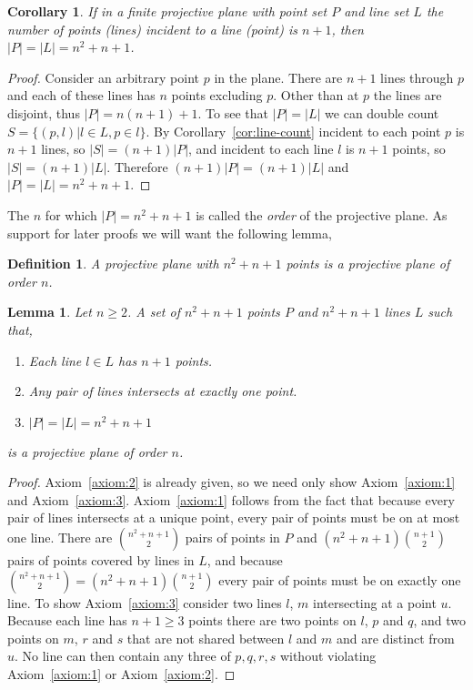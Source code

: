 \documentclass{article}
\newtheorem{lemma}{Lemma}
\newtheorem{corollary}{Corollary}
\newtheorem{definition}{Definition}
\begin{document}
\begin{corollary}
  If in a finite projective plane with point set \(P\) and line set \(L\) the number of points (lines) incident to a line (point) is \(n + 1\), then \(|P| = |L| = n^2 + n + 1\).
\end{corollary}
\begin{proof}\label{cor:p-count}
  Consider an arbitrary point \(p\) in the plane. There are \(n + 1\) lines through \(p\) and each of these lines has \(n\) points excluding \(p\). Other than at \(p\) the lines are disjoint, thus \(|P| = n(n + 1) + 1\).
  To see that \(|P| = |L|\) we can double count \(S = \{(p, l) | l \in L, p \in l\}\). By Corollary~\ref{cor:line-count} incident to each point \(p\) is \(n + 1\) lines, so \(|S| = (n + 1)|P|\), and incident to each line \(l\) is \(n + 1\) points, so \(|S| = (n + 1)|L|\). Therefore \((n + 1)|P| = (n + 1)|L|\) and \(|P| = |L| = n^2 + n + 1\).
\end{proof}

The \(n\) for which \(|P| = n^2 + n + 1\) is called the \textit{order} of the projective plane.
As support for later proofs we will want the following lemma,

\begin{definition}\label{definition:proj-order}
  A projective plane with \(n^{2} + n + 1\) points is a projective plane of order \(n\).
\end{definition}

\begin{lemma}\label{lemma:easy-proj}
  Let \(n \geq 2\). A set of \(n^{2} + n + 1\) points \(P\) and \(n^{2} + n + 1\) lines \(L\) such that,

  \begin{enumerate}
    \item Each line \(l \in L\) has \(n + 1\) points.
    \item Any pair of lines intersects at exactly one point.
    \item \(|P| = |L| = n^{2} + n + 1\)
  \end{enumerate}

  is a projective plane of order \(n\).
\end{lemma}

\begin{proof}
  Axiom~\ref{axiom:2} is already given, so we need only show Axiom~\ref{axiom:1} and Axiom~\ref{axiom:3}. Axiom~\ref{axiom:1} follows from the fact that because every pair of lines intersects at a unique point, every pair of points must be on at most one line. There are \(\binom{n^{2} + n + 1}{2}\) pairs of points in \(P\) and \((n^{2} + n + 1)\binom{n + 1}{2}\) pairs of points covered by lines in \(L\), and because \(\binom{n^{2} + n + 1}{2} = (n^{2} + n + 1)\binom{n + 1}{2}\) every pair of points must be on exactly one line.
  To show Axiom~\ref{axiom:3} consider two lines \(l\), \(m\) intersecting at a point \(u\). Because each line has \(n + 1 \geq 3\) points there are two points on \(l\), \(p\) and \(q\), and two points on \(m\), \(r\) and \(s\) that are not shared between \(l\) and \(m\) and are distinct from \(u\). No line can then contain any three of \(p, q, r, s\) without violating Axiom~\ref{axiom:1} or Axiom~\ref{axiom:2}.
\end{proof}
\end{document}
